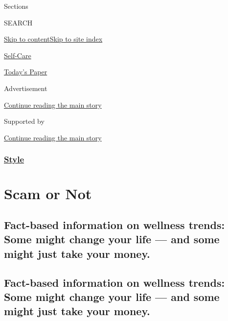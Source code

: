 Sections

SEARCH

\protect\hyperlink{site-content}{Skip to
content}\protect\hyperlink{site-index}{Skip to site index}

\href{https://www.nytimes.com/section/style/self-care/}{Self-Care}

\href{https://myaccount.nytimes.com/auth/login?response_type=cookie\&client_id=vi}{}

\href{https://www.nytimes.com/section/todayspaper}{Today's Paper}

Advertisement

\protect\hyperlink{after-top}{Continue reading the main story}

Supported by

\protect\hyperlink{after-sponsor}{Continue reading the main story}

\hypertarget{style}{%
\subsubsection{\texorpdfstring{\href{/section/style}{Style}}{Style}}\label{style}}

\hypertarget{scam-or-not}{%
\section{Scam or Not}\label{scam-or-not}}

\hypertarget{fact-based-information-on-wellness-trends-some-might-change-your-life--and-some-might-just-take-your-money}{%
\subsection{Fact-based information on wellness trends: Some might change
your life --- and some might just take your
money.}\label{fact-based-information-on-wellness-trends-some-might-change-your-life--and-some-might-just-take-your-money}}

\hypertarget{fact-based-information-on-wellness-trends-some-might-change-your-life--and-some-might-just-take-your-money-1}{%
\subsection{Fact-based information on wellness trends: Some might change
your life --- and some might just take your
money.}\label{fact-based-information-on-wellness-trends-some-might-change-your-life--and-some-might-just-take-your-money-1}}

